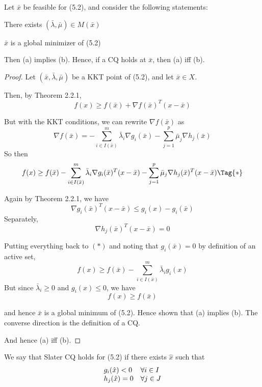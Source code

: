 
Let $\bar x$ be feasible for (5.2), and consider the following statements:
\begin{enumerata}
	\item There exists $(\bar\lambda,\bar\mu)\in M(\bar x)$
	\item $\bar x$ is a global minimizer of (5.2)
\end{enumerata}

Then (a) implies (b). Hence, if a CQ holds at $\bar x$, then (a) iff
(b).


%
%

\begin{proof}
	\def\bx{\bar x}\def\bl{\bar\lambda}\def\bm{\bar\mu}
	\def\Act{I(\bx)}
	Let $(\bx,\bl,\bm)$ be a KKT point of (5.2), and let $\bar x\in X$.

	Then, by Theorem 2.2.1,
	$$
		f(x)\geq f(\bx) + \nabla f(\bx)^T(x-\bx)
	$$

	But with the KKT conditions, we can rewrite $\nabla f(\bx)$ as
	$$
		\nabla f(\bx)=-\sum_{i\in\Act}^m\bl_i \nabla g_i(\bx)-\sum_{j=1}^p\bm_j\nabla h_j(\bx)
	$$
	So then
	\begin{align}
		f(x)\geq f(\bx)-\sum_{i\in\Act}^m\bl_i\nabla g_i(\bx)^T(x-\bx)-\sum_{j=1}^p\bm_j\nabla h_j(\bx)^T(x-\bx)\Tag{*}
	\end{align}

	Again by Theorem 2.2.1, we have
	$$
		\nabla g_i(\bx)^T(x-\bx)\leq g_i(x)-g_i(\bx)
	$$
	Separately,
	$$
		\nabla h_j(\bx)^T(x-\bx)=0
	$$

	Putting everything back to $(*)$ and noting that $g_i(\bar x)=0$ by
	definition of an active set,
	$$
		f(x)\geq f(\bx)-\sum_{i\in\Act}^m\bl_ig_i(x)
	$$
	But since $\bl_i\geq0$ and $g_i(x)\leq0$, we have
	$$
		f(x)\geq f(\bx)
	$$

	and hence $\bar x$ is a global minimum of (5.2). Hence shown that
	(a) implies (b). The converse direction is the definition of a CQ.

	And hence (a) iff (b).
\end{proof}


We say that Slater CQ holds for (5.2) if there exists $\hat x$ such that
$$
	\begin{array}{l l}
		g_i(\hat x)<0 & \forall i\in I \\
		h_j(\hat x)=0 & \forall j\in J
	\end{array}
$$

